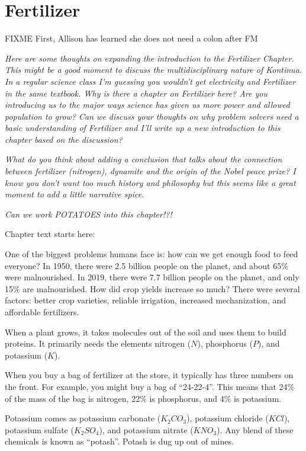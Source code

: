\chapter{Fertilizer}

FIXME 
First, Allison has learned she does not need a colon after FM

\textit{Here are some thoughts on expanding the introduction to the Fertilizer Chapter. This might be a good moment to discuss the multidisciplinary nature of Kontinua. 
In a regular science class I'm guessing you wouldn't get electricity and Fertilizer in the same textbook. Why is there a chapter on Fertilizer here? Are you introducing us to the major ways science has given us more power and allowed population to grow? Can we discuss your thoughts on why problem solvers need a basic understanding of Fertilizer and I'll write up a new introduction to this chapter based on the discussion?}


\textit{What do you think about adding a conclusion that talks about the connection between fertilizer (nitrogen), dynamite and the origin of the Nobel peace prize? I know you don't want too much history and philosophy but this seems like a great moment to add a little narrative spice}.

\textit{Can we work POTATOES into this chapter!?!}

Chapter text starts here: 

One of the biggest problems humans face is: how can we get enough food to feed everyone?
In 1950, there were 2.5 billion people on the planet, and about 65\%
were malnourished. In 2019, there were 7.7 billion people on the
planet, and only 15\% are malnourished. How did crop yields increase
so much? There were several factors: better crop varieties,
reliable irrigation, increased mechanization, and affordable fertilizers.

When a plant grows, it takes molecules out of the soil and uses them
to build proteins. It primarily needs the elements nitrogen ($N$),
phosphorus ($P$), and potassium ($K$).  

When you buy a bag of fertilizer at the store, it typically has
three numbers on the front. For example, you might buy a bag of
``24-22-4''.  This means that 24\% of the mass of the bag is nitrogen,
22\% is phosphorus, and 4\% is potassium.

Potassium comes as potassium carbonate ($K_2CO_3$), potassium chloride
($KCl$), potassium sulfate ($K_2 SO_4$), and potassium nitrate
($KNO_3$). Any blend of these chemicals is known as ``potash''. Potash
is dug up out of mines. 

